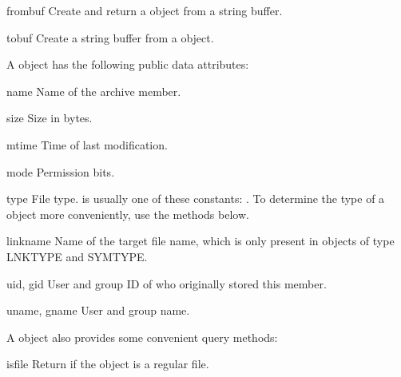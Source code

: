 \begin{methoddesc}{frombuf}{}
    Create and return a  object from a string buffer.
\end{methoddesc}

\begin{methoddesc}{tobuf}{}
    Create a string buffer from a  object.
\end{methoddesc}

A  object has the following public data attributes:
\begin{memberdesc}{name}
    Name of the archive member.
\end{memberdesc}

\begin{memberdesc}{size}
    Size in bytes.
\end{memberdesc}

\begin{memberdesc}{mtime}
    Time of last modification.
\end{memberdesc}

\begin{memberdesc}{mode}
    Permission bits.
\end{memberdesc}

\begin{memberdesc}{type}
    File type.
     is usually one of these constants:
    .
    To determine the type of a  object more conveniently, use
    the  methods below.
\end{memberdesc}

\begin{memberdesc}{linkname}
    Name of the target file name, which is only present in 
    objects of type LNKTYPE and SYMTYPE.
\end{memberdesc}

\begin{memberdesc}{uid, gid}
    User and group ID of who originally stored this member.
\end{memberdesc}

\begin{memberdesc}{uname, gname}
    User and group name.
\end{memberdesc}

A  object also provides some convenient query methods:
\begin{methoddesc}{isfile}{}
    Return  if the  object is a regular file.
\end{methoddesc}

